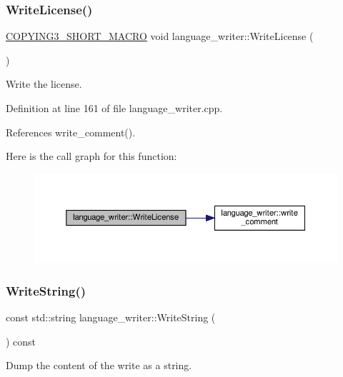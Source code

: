 \subsubsection{\texorpdfstring{Write\+License()}{WriteLicense()}}
{\footnotesize\ttfamily \hyperlink{copyrights__strings_8hpp_abea9b8595a799d03cb5badf253359627}{C\+O\+P\+Y\+I\+N\+G3\+\_\+\+S\+H\+O\+R\+T\+\_\+\+M\+A\+C\+RO} void language\+\_\+writer\+::\+Write\+License (\begin{DoxyParamCaption}{ }\end{DoxyParamCaption})}



Write the license. 



Definition at line 161 of file language\+\_\+writer.\+cpp.



References write\+\_\+comment().

Here is the call graph for this function\+:
\nopagebreak
\begin{figure}[H]
\begin{center}
\leavevmode
\includegraphics[width=350pt]{d6/d67/classlanguage__writer_a8fa5e9dadb7566ee668c16555a13157a_cgraph}
\end{center}
\end{figure}
\mbox{\label{classlanguage__writer_a12e31915cd8caac0dfaf0bd5737a7a41}} 
\subsubsection{\texorpdfstring{Write\+String()}{WriteString()}}
{\footnotesize\ttfamily const std\+::string language\+\_\+writer\+::\+Write\+String (\begin{DoxyParamCaption}{ }\end{DoxyParamCaption}) const}



Dump the content of the write as a string. 



